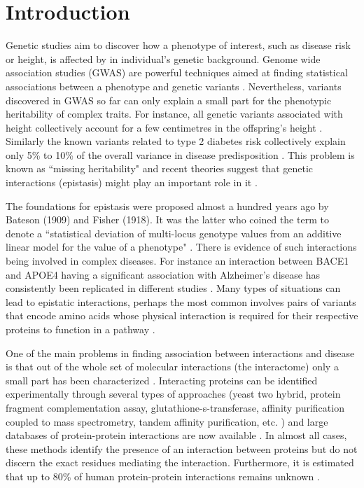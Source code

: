 \section{Introduction}

Genetic studies aim to discover how a phenotype of interest, such as disease risk or height, is affected by in individual's genetic background. 
Genome wide association studies (GWAS) are powerful techniques aimed at finding statistical associations between a phenotype and genetic variants \cite{clarke2011basic}. 
Nevertheless, variants discovered in GWAS so far can only explain a small part for the phenotypic heritability of complex traits. 
For instance, all genetic variants associated with height collectively account for a few centimetres in the offspring's height \cite{wood2014defining}.
Similarly the known variants related to type 2 diabetes risk collectively explain only 5\% to 10\% of the overall variance in disease predisposition \cite{morris2012large, consortium2014genome}. 
This problem is known as ``missing heritability" \cite{manolio2009finding} and recent theories suggest that genetic interactions (epistasis) might play an important role in it \cite{zuk2012mystery, zuk2014searching}.

The foundations for epistasis \cite{gao2010classification} were proposed almost a hundred years ago by Bateson (1909) and Fisher (1918). 
It was the latter who coined the term to denote a ``statistical deviation of multi-locus genotype values from an additive linear model for the value of a phenotype" \cite{gao2010classification}. 
There is evidence of such interactions being involved in complex diseases. For instance an interaction between BACE1 and APOE4 having a significant association with Alzheimer's disease has consistently been replicated in different studies \cite{combarros2009epistasis}. 
Many types of situations can lead to epistatic interactions, perhaps the most common involves pairs of variants that encode amino acids whose physical interaction is required for their respective proteins to function in a pathway \cite{cordell2009detecting, cordell2002epistasis}.

One of the main problems in finding association between interactions and disease is that out of the whole set of molecular interactions (the interactome) only a small part has been characterized \cite{venkatesan2009empirical}. 
Interacting proteins can be identified experimentally through several types of approaches (yeast two hybrid, protein fragment complementation assay, glutathione-s-transferase, affinity purification coupled to mass spectrometry, tandem affinity purification, etc. \cite{shoemaker2007deciphering}) and large databases of protein-protein interactions are now available \cite{stark2006biogrid, shoemaker2007deciphering}. 
In almost all cases, these methods identify the presence of an interaction between proteins but do not discern the exact residues mediating the interaction. 
Furthermore, it is estimated that up to 80\% of human protein-protein interactions remains unknown \cite{venkatesan2009empirical}.

